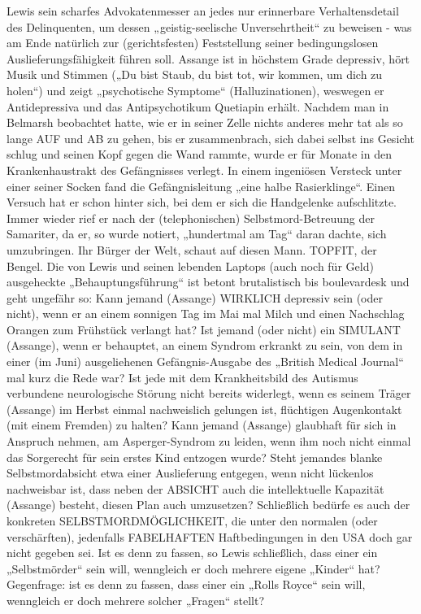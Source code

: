 \begin{multicols}{2}
{Lewis sein scharfes Advokatenmesser an jedes nur erinnerbare Verhaltensdetail des Delinquenten, um dessen
„geistig-seelische Unversehrtheit“ zu beweisen - was am
Ende natürlich zur (gerichtsfesten) Feststellung seiner
bedingungslosen Auslieferungsfähigkeit führen soll. \textCR
Assange ist in höchstem Grade depressiv, hört Musik
und Stimmen („Du bist Staub, du bist tot, wir kommen,
um dich zu holen“) und zeigt „psychotische Symptome“
(Halluzinationen), weswegen er Antidepressiva und das
Antipsychotikum Quetiapin erhält. Nachdem man in
Belmarsh beobachtet hatte, wie er in seiner Zelle nichts
anderes mehr tat als so lange AUF und AB zu gehen, bis
er zusammenbrach, sich dabei selbst ins Gesicht schlug
und seinen Kopf gegen die Wand rammte, wurde er für
Monate in den Krankenhaustrakt des Gefängnisses verlegt. In einem ingeniösen Versteck unter einer seiner
Socken fand die Gefängnisleitung „eine halbe Rasierklinge“. Einen Versuch hat er schon hinter sich, bei dem
er sich die Handgelenke aufschlitzte. Immer wieder rief
er nach der (telephonischen) Selbstmord-Betreuung der
Samariter, da er, so wurde notiert, „hundertmal am Tag“
daran dachte, sich umzubringen. \textCR
Ihr Bürger der Welt, schaut auf diesen Mann. \textCR
TOPFIT, der Bengel. Die von Lewis und seinen lebenden
Laptops (auch noch für Geld) ausgeheckte „Behauptungsführung“ ist betont brutalistisch bis boulevardesk
und geht ungefähr so: \textCR
Kann jemand (Assange) WIRKLICH depressiv sein (oder
nicht), wenn er an einem sonnigen Tag im Mai mal Milch
und einen Nachschlag Orangen zum Frühstück verlangt
hat? Ist jemand (oder nicht) ein SIMULANT (Assange),
wenn er behauptet, an einem Syndrom erkrankt zu
sein, von dem in einer (im Juni) ausgeliehenen Gefängnis-Ausgabe des „British Medical Journal“ mal kurz die
Rede war? Ist jede mit dem Krankheitsbild des Autismus verbundene neurologische Störung nicht bereits
widerlegt, wenn es seinem Träger (Assange) im Herbst
einmal nachweislich gelungen ist, flüchtigen Augenkontakt (mit einem Fremden) zu halten? Kann jemand
(Assange) glaubhaft für sich in Anspruch nehmen, am
Asperger-Syndrom zu leiden, wenn ihm noch nicht einmal das Sorgerecht für sein erstes Kind entzogen wurde?
Steht jemandes blanke Selbstmordabsicht etwa einer
Auslieferung entgegen, wenn nicht lückenlos nachweisbar ist, dass neben der ABSICHT auch die intellektuelle
Kapazität (Assange) besteht, diesen Plan auch umzusetzen? Schließlich bedürfe es auch der konkreten SELBSTMORDMÖGLICHKEIT, die unter den normalen (oder
verschärften), jedenfalls FABELHAFTEN Haftbedingungen in den USA doch gar nicht gegeben sei. Ist es denn
zu fassen, so Lewis schließlich, dass einer ein „Selbstmörder“ sein will, wenngleich er doch mehrere eigene
„Kinder“ hat? Gegenfrage: ist es denn zu fassen, dass einer ein „Rolls Royce“ sein will, wenngleich er doch mehrere solcher „Fragen“ stellt?}



\end{multicols}
